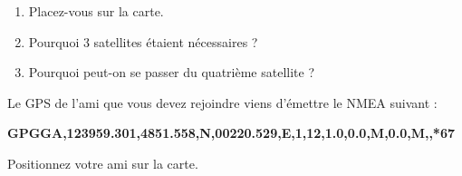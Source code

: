 \begin{exersb}
\begin{enumerate}
			
			\item Placez-vous sur la carte.

			\item Pourquoi 3 satellites étaient nécessaires ?
		
			\item Pourquoi peut-on se passer du quatrième satellite ?
		
		\end{enumerate}
	\end{exersb}
	\begin{exersb}

			Le GPS de l’ami que vous devez rejoindre viens d’émettre le NMEA suivant :
			
			\hfill\textbf{GPGGA,123959.301,4851.558,N,00220.529,E,1,12,1.0,0.0,M,0.0,M,,*67}\hfill\allowbreak
		
	 	Positionnez votre ami sur la carte.
			

	\end{exersb}
\newpage
